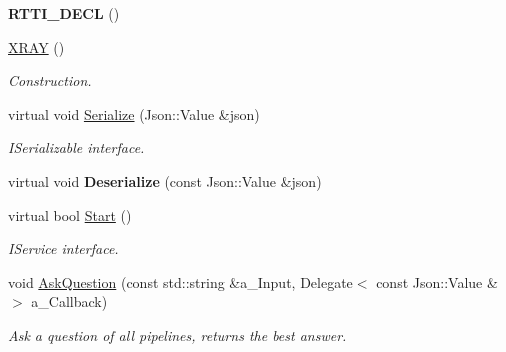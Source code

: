 \begin{DoxyCompactItemize}
\item 
\mbox{\label{class_x_r_a_y_abb8aab3e85d4513d9d4a84486821d811}} 
{\bfseries R\+T\+T\+I\+\_\+\+D\+E\+CL} ()
\item 
\mbox{\label{class_x_r_a_y_a78ee9b084ef133b8230ee2509707b1f4}} 
\hyperlink{class_x_r_a_y_a78ee9b084ef133b8230ee2509707b1f4}{X\+R\+AY} ()
\begin{DoxyCompactList}\small\item\em Construction. \end{DoxyCompactList}\item 
\mbox{\label{class_x_r_a_y_a1967d955d6cc9eb80526ffd225d68647}} 
virtual void \hyperlink{class_x_r_a_y_a1967d955d6cc9eb80526ffd225d68647}{Serialize} (Json\+::\+Value \&json)
\begin{DoxyCompactList}\small\item\em I\+Serializable interface. \end{DoxyCompactList}\item 
\mbox{\label{class_x_r_a_y_a8671290efd2622601d0f6a959ee427f7}} 
virtual void {\bfseries Deserialize} (const Json\+::\+Value \&json)
\item 
\mbox{\label{class_x_r_a_y_a8582fdb2bab6dae94221e061e82428b5}} 
virtual bool \hyperlink{class_x_r_a_y_a8582fdb2bab6dae94221e061e82428b5}{Start} ()
\begin{DoxyCompactList}\small\item\em I\+Service interface. \end{DoxyCompactList}\item 
\mbox{\label{class_x_r_a_y_a0b166b2c74dee68577ff186ae3120e46}} 
void \hyperlink{class_x_r_a_y_a0b166b2c74dee68577ff186ae3120e46}{Ask\+Question} (const std\+::string \&a\+\_\+\+Input, Delegate$<$ const Json\+::\+Value \&$>$ a\+\_\+\+Callback)
\begin{DoxyCompactList}\small\item\em Ask a question of all pipelines, returns the best answer. \end{DoxyCompactList}\item 
\mbox{\label{class_x_r_a_y_a44a3a604628f62cf0470c861242bc892}} 

\end{DoxyCompactItemize}
